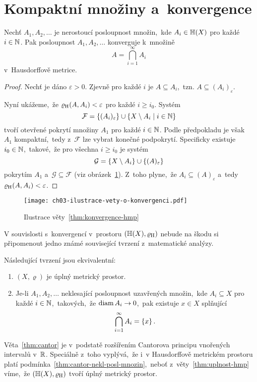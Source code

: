 \section{Kompaktní množiny a~konvergence}\label{sec:konvergence-hmp}

\begin{theorem}\label{thm:konvergence-hmp}
    Nechť $A_1,A_2,\ldots$ je nerostoucí posloupnost množin,~kde $A_i\in\mathbb{H}(X)$ pro každé $i\in\mathbb{N}$. Pak posloupnost $A_1,A_2,\ldots$ konverguje k~množině
    \[A=\bigcap_{i=1}^\infty A_i\]
    v~Hausdorffově metrice.
\end{theorem}
\begin{proof}
    Nechť je dáno $\varepsilon>0$. Zjevně pro každé $i$ je $A\subseteq A_i$,~tzn. $A\subseteq(A_i)_\varepsilon$.
    
    Nyní ukážeme,~že $\varrho_\textup{H}(A,A_i)<\varepsilon$ pro každé $i\geqslant i_0$. Systém
    \[\mathcal{F}=\left\{(A_i)_\varepsilon\right\}\cup\left\{X\setminus A_i\mid i\in\mathbb{N}\right\}\]
    tvoří otevřené pokrytí množiny $A_1$ pro každé $i\in\mathbb{N}$. Podle předpokladu je však $A_1$ kompaktní,~tedy z~$\mathcal{F}$ lze vybrat konečné podpokrytí. Specificky existuje $i_0\in\mathbb{N}$,~takové,~že pro všechna $i\geqslant i_0$ je systém
    \[\mathcal{G}=\left\{X\setminus A_i\right\}\cup\left\{(A)_\varepsilon\right\}\]
    pokrytím $A_1$ a~$\mathcal{G}\subseteq\mathcal{F}$ (viz obrázek~\ref{fig:konvergence-hmp}). Z~toho plyne,~že $A_i\subseteq (A)_\varepsilon$ a~tedy $\varrho_\textup{H}(A,A_i)<\varepsilon$.
\end{proof}
\begin{figure}[h]
    \centering
    \texttt{[image: ch03-ilustrace-vety-o-konvergenci.pdf]}
    \caption{Ilustrace věty~\ref{thm:konvergence-hmp}}
    \label{fig:konvergence-hmp}
\end{figure}

V souvislosti s~konvergencí v~prostoru $(\mathbb{H}(X),\varrho_\textup{H})$ nebude na škodu si připomenout jedno známé související tvrzení z~matematické analýzy.
\begin{theorem}\label{thm:cantor}
    Následující tvrzení jsou ekvivalentní:
    \begin{enumerate}[label=(\roman*)]
        \item\label{thm:cantor-uplnost} $(X,\varrho)$ je úplný metrický prostor.
        \item\label{thm:cantor-nekl-posl-mnozin} Je-li $A_1,A_2,\ldots$ neklesající posloupnost uzavřených množin,~kde $A_i\subseteq X$ pro každé $i\in\mathbb{N}$,~takových,~že $\operatorname{diam}{A_i}\to 0$,~pak existuje $x\in X$ splňující
        \[\bigcap_{i=1}^\infty A_i=\left\{x\right\}.\]
    \end{enumerate}
\end{theorem}
Věta~\ref{thm:cantor} je v~podstatě rozšířením Cantorova principu vnořených intervalů v~$\mathbb{R}$. Speciálně z~toho vyplývá,~že i~v Hausdorffově metrickém prostoru platí podmínka~\ref{thm:cantor-nekl-posl-mnozin},~neboť z~věty~\ref{thm:uplnost-hmp} víme,~že $(\mathbb{H}(X),\varrho_\textup{H})$ tvoří úplný metrický prostor.

